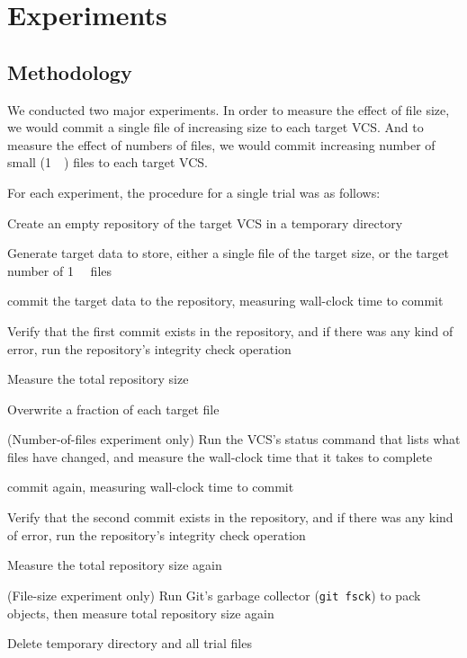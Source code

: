 \section{Experiments}



\subsection{Methodology}

We conducted two major experiments.
In order to measure the effect of file size, we would \gls{commit} a single file of increasing size to each target \gls{VCS}.
And to measure the effect of numbers of files, we would \gls{commit} increasing number of small (\SI{1}{\kibi\byte}) files to each target \gls{VCS}.


For each experiment, the procedure for a single trial was as follows:
\begin{tight_enumerate}
    \item Create an empty \gls{repository} of the target \gls{VCS} in a temporary directory
    \item Generate target data to store, either a single file of the target size, or the target number of \SI{1}{\kibi\byte} files
    \item \Gls{commit} the target data to the \gls{repository}, measuring wall-clock time to \gls{commit}
    \item Verify that the first \gls{commit} exists in the \gls{repository}, and if there was any kind of error, run the \gls{repository}'s integrity check operation
    \item Measure the total \gls{repository} size
    \item Overwrite a fraction of each target file
    \item (Number-of-files experiment only) Run the \gls{VCS}'s status command that lists what files have changed, and measure the wall-clock time that it takes to complete
    \item \Gls{commit} again, measuring wall-clock time to \gls{commit}
    \item Verify that the second \gls{commit} exists in the \gls{repository}, and if there was any kind of error, run the \gls{repository}'s integrity check operation
    \item Measure the total \gls{repository} size again
    \item (File-size experiment only) Run Git's garbage collector (\lstinline{git fsck}) to pack objects, then measure total \gls{repository} size again
    \item Delete temporary directory and all trial files
\end{tight_enumerate}

